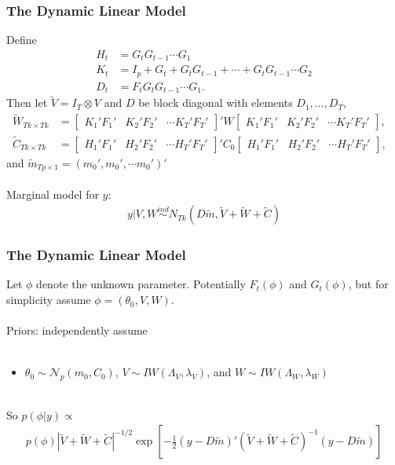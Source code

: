 \documentclass[xcolor=dvipsnames]{beamer}
\newcommand\N{\mathcal{N}}
\begin{document}
\begin{frame}
  \frametitle{The Dynamic Linear Model} 
Define 
\begin{align*}
H_t &= G_tG_{t-1}\cdots G_1\\ 
K_t &= I_p + G_t + G_tG_{t-1} + \cdots + G_tG_{t-1}\cdots G_2\\ 
D_t &= F_tG_tG_{t-1}\cdots G_1.
\end{align*} Then let $\tilde{V}=I_T\otimes V$ and $D$ be block diagonal with elements $D_1,\ldots,D_T$, 
\begin{align*}
\tilde{W}_{Tk\times Tk} &= \begin{bmatrix} K_1'F_1' & K_2'F_2' & \cdots K_T'F_T' \end{bmatrix}' W \begin{bmatrix} K_1'F_1' & K_2'F_2' & \cdots K_T'F_T' \end{bmatrix}, &\\
\tilde{C}_{Tk\times Tk} &= \begin{bmatrix} H_1'F_1' & H_2'F_2' & \cdots H_T'F_T' \end{bmatrix}' C_0 \begin{bmatrix} H_1'F_1' & H_2'F_2' & \cdots H_T'F_T' \end{bmatrix},&
\end{align*}
and $\tilde{m}_{Tp\times 1} = (m_0', m_0', \cdots m_0')'$\\~\\

Marginal model for $y$: 
\begin{align*}
  y|V,W \stackrel{ind}{\sim} N_{Tk}(D\tilde{m}, \tilde{V} + \tilde{W} + \tilde{C})
\end{align*}
\end{frame}

\begin{frame}
  \frametitle{The Dynamic Linear Model} 
Let $\phi$ denote the unknown parameter. Potentially $F_t(\phi)$ and $G_t(\phi)$, but for simplicity assume $\phi=(\theta_0,V,W)$.\\~\\

Priors: independently assume \\~\\
\begin{itemize}
\item[]$\theta_0\sim \N_p(m_0,C_0)$, $V\sim IW(\Lambda_V,\lambda_V)$, and $W\sim IW(\Lambda_W,\lambda_W)$\\~\\
\end{itemize}

So $p(\phi|y)\propto$
\begin{align*}
p(\phi)|\tilde{V} + \tilde{W} + \tilde{C}|^{-1/2}\exp\left[-\frac{1}{2}\left(y-D\tilde{m}\right)'(\tilde{V} + \tilde{W} + \tilde{C})^{-1}\left(y-D\tilde{m}\right)\right]
\end{align*}
\end{frame}
\end{document}
